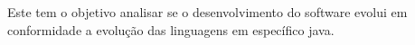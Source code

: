 Este tem o objetivo analisar se o desenvolvimento do software evolui em conformidade a evolução das linguagens em específico java.